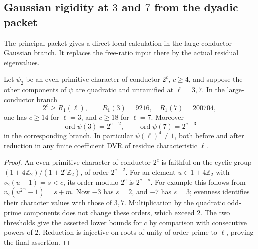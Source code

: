 \subsection{Gaussian rigidity at \(3\) and \(7\) from the dyadic packet}
\label{subsec:sr-gaussian-local}
The principal packet gives a direct local calculation in the
large-conductor Gaussian branch. It replaces the free-ratio
input there by the actual residual eigenvalues.

\begin{srlemma}
\label{lem:sr-dyadic-three-seven}
Let \(\psi_2\) be an even primitive character of conductor
\(2^c\), \(c\ge4\), and suppose the other components of
\(\psi\) are quadratic and unramified at \(\ell=3,7\).
In the large-conductor branch
\[
 2^c\ge R_1(\ell),\qquad
 R_1(3)=9216,\quad R_1(7)=200704,
\]
one has \(c\ge14\) for \(\ell=3\), and \(c\ge18\) for
\(\ell=7\). Moreover
\[
 \operatorname{ord}\psi(3)=2^{c-2},\qquad
 \operatorname{ord}\psi(7)=2^{c-3}
\]
in the corresponding branch. In particular
\(\psi(\ell)^4\ne1\), both before and after reduction in any
finite coefficient DVR of residue characteristic \(\ell\).
\end{srlemma}
\begin{proof}
An even primitive character of conductor \(2^c\) is faithful
on the cyclic group
\((1+4\mathbb Z_2)/(1+2^c\mathbb Z_2)\), of order \(2^{c-2}\).
For an element \(u\in1+4\mathbb Z_2\) with
\(v_2(u-1)=s<c\), its order modulo \(2^c\) is \(2^{c-s}\).
For example this follows from
\(v_2(u^{2^m}-1)=s+m\).
Now \(-3\) has \(s=2\), and \(-7\) has \(s=3\);
evenness identifies their character values with those of
\(3,7\).
Multiplication by the quadratic odd-prime components does
not change these orders, which exceed \(2\).
The two thresholds give the asserted lower bounds for \(c\)
by comparison with consecutive powers of \(2\).
Reduction is injective on roots of unity of order prime to
\(\ell\), proving the final assertion.
\end{proof}

